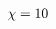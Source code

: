 \documentclass[preview]{standalone}
\begin{document}
\begin{align*}
\begin{equation} \chi =  1 &  0 &  \end{equation}
\end{align*}
\end{document}
